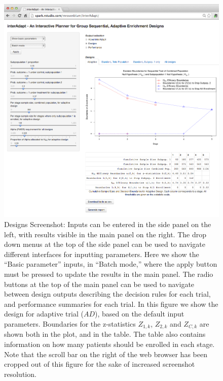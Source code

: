 \documentclass[article]{jss}
\begin{document}
\begin{figure}[h]
\centering{}\includegraphics[width=1\textwidth]{2014-02-29_screenshot_designs.png} 
\caption{Designs Screenshot: Inputs can be entered in the side panel on the left, with results visible in the main panel on the right. The drop down menus at the top of the side panel can be used to navigate different interfaces for inputting parameters. Here we show the ``Basic parameter'' inputs, in ``Batch mode,'' where the apply button must be pressed to update the results in the main panel. The radio buttons at the top of the main panel can be used to navigate between design outputs describing the decision rules for each trial, and performance summaries for each trial. In this figure we show the design for adaptive trial ($AD$), based on the default input parameters. Boundaries for the z-statistics $Z_{1,k}$, $Z_{2,k}$ and $Z_{C,k}$ are shown both in the plot, and in the table. The table also contains information on how many patients should be enrolled in each stage. Note that the scroll bar on the right of the web browser has been cropped out of this figure for the sake of increased screenshot resolution.  \label{fig:designs} }
\end{figure}%
\end{document}
